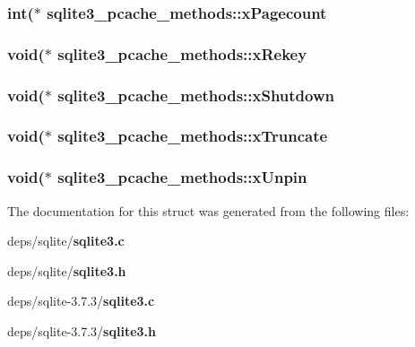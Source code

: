\subsubsection{\setlength{\rightskip}{0pt plus 5cm}int($\ast$ \bf{sqlite3\_\-pcache\_\-methods::x\-Pagecount}}\label{structsqlite3__pcache__methods_3cf5256414de1732923557b15294a0b9}


\subsubsection{\setlength{\rightskip}{0pt plus 5cm}void($\ast$ \bf{sqlite3\_\-pcache\_\-methods::x\-Rekey}}\label{structsqlite3__pcache__methods_4d5d0fab4f9e718a5a30d175e14ed331}


\subsubsection{\setlength{\rightskip}{0pt plus 5cm}void($\ast$ \bf{sqlite3\_\-pcache\_\-methods::x\-Shutdown}}\label{structsqlite3__pcache__methods_9aed14461058e3d7eaeb1683defab847}


\subsubsection{\setlength{\rightskip}{0pt plus 5cm}void($\ast$ \bf{sqlite3\_\-pcache\_\-methods::x\-Truncate}}\label{structsqlite3__pcache__methods_9f0b8a2c1f273f39a78fca90f96ff290}


\subsubsection{\setlength{\rightskip}{0pt plus 5cm}void($\ast$ \bf{sqlite3\_\-pcache\_\-methods::x\-Unpin}}\label{structsqlite3__pcache__methods_847af4ca252e084514050013d12ac05a}




The documentation for this struct was generated from the following files:\begin{CompactItemize}
\item 
deps/sqlite/\bf{sqlite3.c}\item 
deps/sqlite/\bf{sqlite3.h}\item 
deps/sqlite-3.7.3/\bf{sqlite3.c}\item 
deps/sqlite-3.7.3/\bf{sqlite3.h}\end{CompactItemize}
